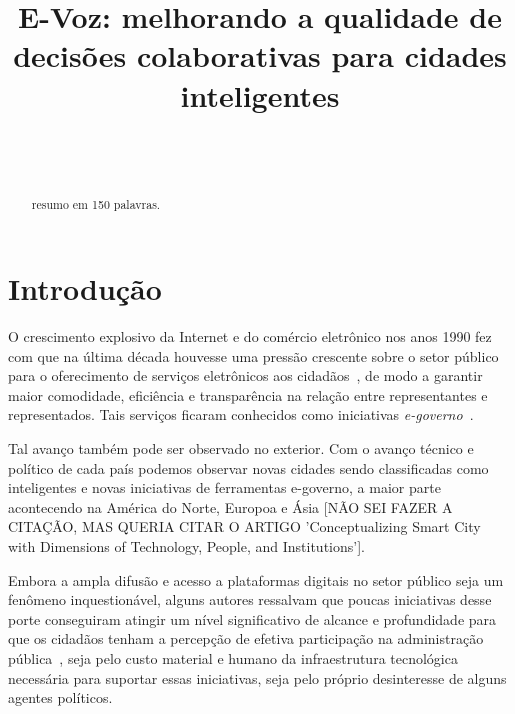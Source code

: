 \documentclass{sigchi}
\def\plaintitle{E-Voz: melhorando a qualidade de decisões colaborativas para cidades inteligentes}
\def\plainkeywords{escrever; aqui; obrigatório}
\begin{document}
\title{\plaintitle}

\author{%
  \\
  \\
}

\maketitle

\begin{abstract}
  resumo em 150 palavras.
\end{abstract}

 

\keywords{\plainkeywords}

\section{Introdução}
O crescimento explosivo da Internet e do comércio eletrônico nos anos 1990 fez com que na última década houvesse uma pressão crescente sobre o setor público para o oferecimento de serviços eletrônicos aos cidadãos~\cite{tat:2002}, de modo a garantir maior comodidade, eficiência e transparência na relação entre representantes e representados. Tais serviços ficaram conhecidos como iniciativas \textit{e-governo}~\cite{carter:2005}.

Tal avanço também pode ser observado no exterior. Com o avanço técnico e político de cada país podemos observar novas cidades sendo classificadas como inteligentes e novas iniciativas de ferramentas e-governo, a maior parte acontecendo na América do Norte, Europoa e Ásia [NÃO SEI FAZER A CITAÇÃO, MAS QUERIA CITAR O ARTIGO 'Conceptualizing Smart City with Dimensions of Technology, People, and Institutions'].

Embora a ampla difusão e acesso a plataformas digitais no setor público seja um fenômeno inquestionável, alguns autores ressalvam que poucas iniciativas desse porte conseguiram atingir um nível significativo de alcance e profundidade para que os cidadãos tenham a percepção de efetiva participação na administração pública~\cite{layne:2001}, seja pelo custo material e humano da infraestrutura tecnológica necessária para suportar essas iniciativas, seja pelo próprio desinteresse de alguns agentes políticos.
\end{document}
